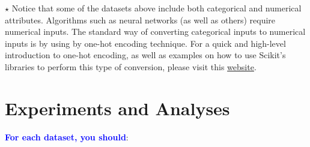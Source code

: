 \documentclass[letterpaper]{article}
\newcommand{\HIGHLIGHT}[1]{\textcolor{blue}{\textbf{#1}}}
\begin{document}
\noindent $\star$ Notice that some of the datasets above include both categorical and numerical attributes. Algorithms such as neural networks (as well as others) require numerical inputs. The standard way of converting categorical inputs to numerical inputs is by using by one-hot encoding technique. For a quick and high-level introduction to one-hot encoding, as well as examples on how to use Scikit's libraries to perform this type of conversion, please visit this \href{https://datagy.io/sklearn-one-hot-encode}{website}.



\newpage
\section{Experiments and Analyses}

\HIGHLIGHT{For each dataset, you should}:
\end{document}
